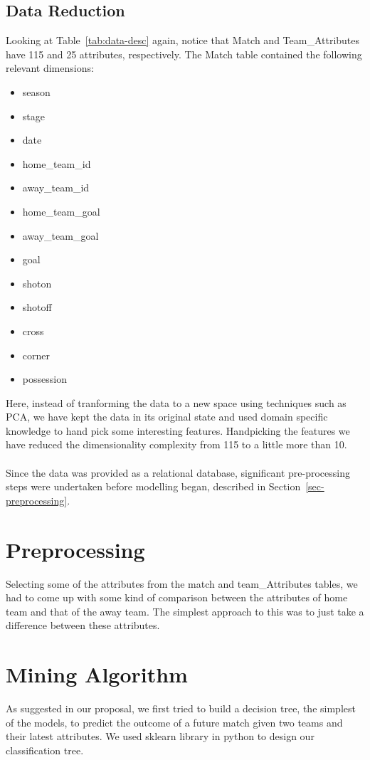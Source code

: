 \documentclass[11pt]{article}
\begin{document}
\subsection{Data Reduction}
Looking at Table~\ref{tab:data-desc} again, notice that Match and Team\_Attributes have 115 and 25 attributes, respectively.
The Match table contained the following relevant dimensions:
\begin{itemize}
  \setlength\itemsep{0em}
  \item season
  \item stage
  \item date
  \item home\_team\_id
  \item away\_team\_id
  \item home\_team\_goal
  \item away\_team\_goal
  \item goal
  \item shoton
  \item shotoff
  \item cross
  \item corner
  \item possession
\end{itemize}
Here, instead of tranforming the data to a new space using techniques such as PCA, we have kept the data in its original state and used domain specific knowledge to hand pick some interesting features. Handpicking the features we have reduced the dimensionality complexity from 115 to a little more than 10.
\\
\\
Since the data was provided as a relational database, significant pre-processing steps were undertaken before modelling began, described in Section~\ref{sec-preprocessing}.
\section{Preprocessing}
Selecting some of the attributes from the match and team_Attributes tables, we had to come up with some kind of comparison between the attributes of home team and that of the away team. The simplest approach to this was to just take a difference between these attributes. 

\section{Mining Algorithm}
As suggested in our proposal, we first tried to build a decision tree, the simplest of the models, to predict the outcome of a future match given two teams and their latest attributes. We used sklearn library in python to design our classification tree.



\end{document}
